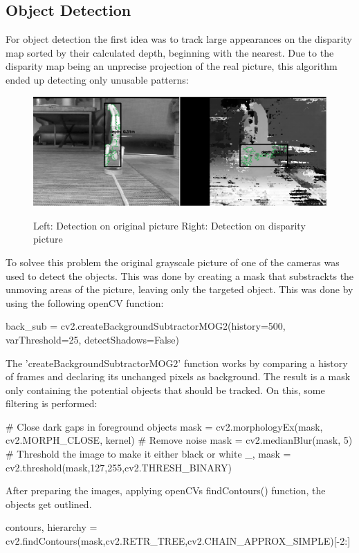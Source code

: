 \documentclass[journal,onecolumn]{IEEEtran}
\begin{document}
\subsection{Object Detection}
\noindent For object detection the first idea was to track large appearances on the disparity map sorted by their calculated depth, beginning with the nearest. Due to the disparity map being an unprecise projection of the real picture, this algorithm ended up detecting only unusable patterns:
\begin{figure}[H]
	\centering
	\includegraphics[scale=0.5]{handstand_comparison.png}
	\label{tracking}
	\captionsetup{justification=centering}
	\caption{Left: Detection on original picture Right: Detection on disparity picture }
\end{figure}
\noindent To solvee this problem the original grayscale picture of one of the cameras was used to detect the objects. This was done by creating a mask that substrackts the unmoving areas of the picture, leaving only the targeted object. This was done by using the following openCV function:
\begin{python}
back_sub = cv2.createBackgroundSubtractorMOG2(history=500, varThreshold=25, detectShadows=False)
\end{python}
\noindent The  'createBackgroundSubtractorMOG2' function works by comparing a history of frames and declaring its unchanged pixels as background. The result is a mask only containing the potential objects that should be tracked. On this, some filtering is performed:
\begin{python}
# Close dark gaps in foreground objects
mask = cv2.morphologyEx(mask, cv2.MORPH_CLOSE, kernel)
# Remove noise
mask = cv2.medianBlur(mask, 5) 
# Threshold the image to make it either black or white
_, mask = cv2.threshold(mask,127,255,cv2.THRESH_BINARY)
\end{python}
\noindent After preparing the images, applying openCVs findContours() function, the objects get outlined.
\begin{python}
contours, hierarchy = cv2.findContours(mask,cv2.RETR_TREE,cv2.CHAIN_APPROX_SIMPLE)[-2:]
\end{python}
\end{document}
